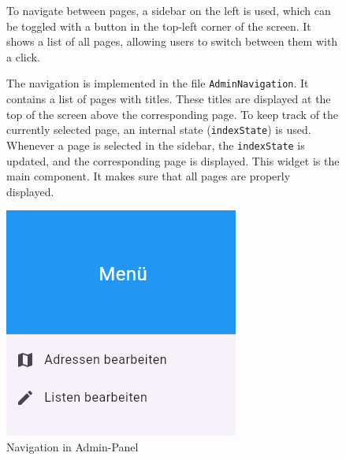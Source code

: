 \begin{figure}[H]

\begin{minipage}{0.58\textwidth}
    To navigate between pages, a sidebar on the left is used, which can be toggled with a button in the top-left corner of the screen. It shows a list of all pages, allowing users to switch between them with a click.

    The navigation is implemented in the file \texttt{AdminNavigation}. It contains a list of pages with titles. These titles are displayed at the top of the screen above the corresponding page. To keep track of the currently selected page, an internal state (\texttt{indexState}) is used. Whenever a page is selected in the sidebar, the \texttt{indexState} is updated, and the corresponding page is displayed. This widget is the main component. It makes sure that all pages are properly displayed.
    \end{minipage}
    \hfill
    \begin{minipage}{0.38\textwidth}
    \centering
    \includegraphics[width=\linewidth]{images/AdminPanel/Menu.png}
    \caption{Navigation in Admin-Panel}
    \label{fig:adminpanel_navigation}
\end{minipage}

\end{figure}

